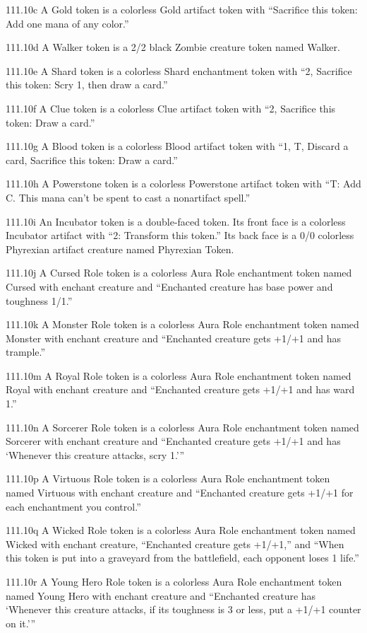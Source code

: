 111.10c A Gold token is a colorless Gold artifact token with “Sacrifice this token: Add one mana of any color.”

111.10d A Walker token is a 2/2 black Zombie creature token named Walker.

111.10e A Shard token is a colorless Shard enchantment token with “{2}, Sacrifice this token: Scry 1, then draw a card.”

111.10f A Clue token is a colorless Clue artifact token with “{2}, Sacrifice this token: Draw a card.”

111.10g A Blood token is a colorless Blood artifact token with “{1}, {T}, Discard a card, Sacrifice this token: Draw a card.”

111.10h A Powerstone token is a colorless Powerstone artifact token with “{T}: Add {C}. This mana can’t be spent to cast a nonartifact spell.”

111.10i An Incubator token is a double-faced token. Its front face is a colorless Incubator artifact with “{2}: Transform this token.” Its back face is a 0/0 colorless Phyrexian artifact creature named Phyrexian Token.

111.10j A Cursed Role token is a colorless Aura Role enchantment token named Cursed with enchant creature and “Enchanted creature has base power and toughness 1/1.”

111.10k A Monster Role token is a colorless Aura Role enchantment token named Monster with enchant creature and “Enchanted creature gets +1/+1 and has trample.”

111.10m A Royal Role token is a colorless Aura Role enchantment token named Royal with enchant creature and “Enchanted creature gets +1/+1 and has ward {1}.”

111.10n A Sorcerer Role token is a colorless Aura Role enchantment token named Sorcerer with enchant creature and “Enchanted creature gets +1/+1 and has ‘Whenever this creature attacks, scry 1.’”

111.10p A Virtuous Role token is a colorless Aura Role enchantment token named Virtuous with enchant creature and “Enchanted creature gets +1/+1 for each enchantment you control.”

111.10q A Wicked Role token is a colorless Aura Role enchantment token named Wicked with enchant creature, “Enchanted creature gets +1/+1,” and “When this token is put into a graveyard from the battlefield, each opponent loses 1 life.”

111.10r A Young Hero Role token is a colorless Aura Role enchantment token named Young Hero with enchant creature and “Enchanted creature has ‘Whenever this creature attacks, if its toughness is 3 or less, put a +1/+1 counter on it.’”


